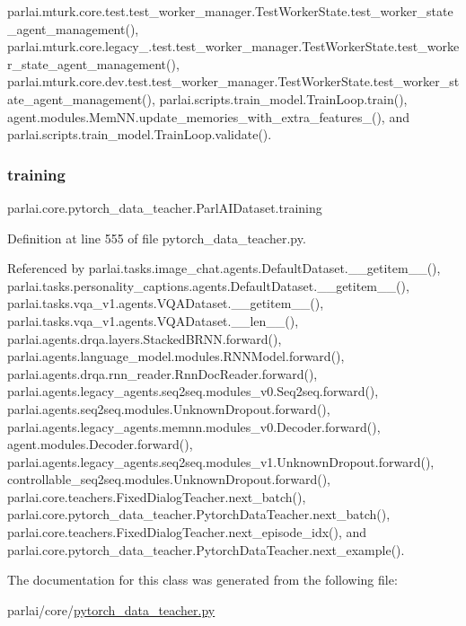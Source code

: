 parlai.\+mturk.\+core.\+test.\+test\+\_\+worker\+\_\+manager.\+Test\+Worker\+State.\+test\+\_\+worker\+\_\+state\+\_\+agent\+\_\+management(), parlai.\+mturk.\+core.\+legacy\+\_.\+test.\+test\+\_\+worker\+\_\+manager.\+Test\+Worker\+State.\+test\+\_\+worker\+\_\+state\+\_\+agent\+\_\+management(), parlai.\+mturk.\+core.\+dev.\+test.\+test\+\_\+worker\+\_\+manager.\+Test\+Worker\+State.\+test\+\_\+worker\+\_\+state\+\_\+agent\+\_\+management(), parlai.\+scripts.\+train\+\_\+model.\+Train\+Loop.\+train(), agent.\+modules.\+Mem\+N\+N.\+update\+\_\+memories\+\_\+with\+\_\+extra\+\_\+features\+\_\+(), and parlai.\+scripts.\+train\+\_\+model.\+Train\+Loop.\+validate().

\mbox{\label{classparlai_1_1core_1_1pytorch__data__teacher_1_1ParlAIDataset_a37ac7bc953e6c36a284c6031af796bfa}} 
\subsubsection{\texorpdfstring{training}{training}}
{\footnotesize\ttfamily parlai.\+core.\+pytorch\+\_\+data\+\_\+teacher.\+Parl\+A\+I\+Dataset.\+training}



Definition at line 555 of file pytorch\+\_\+data\+\_\+teacher.\+py.



Referenced by parlai.\+tasks.\+image\+\_\+chat.\+agents.\+Default\+Dataset.\+\_\+\+\_\+getitem\+\_\+\+\_\+(), parlai.\+tasks.\+personality\+\_\+captions.\+agents.\+Default\+Dataset.\+\_\+\+\_\+getitem\+\_\+\+\_\+(), parlai.\+tasks.\+vqa\+\_\+v1.\+agents.\+V\+Q\+A\+Dataset.\+\_\+\+\_\+getitem\+\_\+\+\_\+(), parlai.\+tasks.\+vqa\+\_\+v1.\+agents.\+V\+Q\+A\+Dataset.\+\_\+\+\_\+len\+\_\+\+\_\+(), parlai.\+agents.\+drqa.\+layers.\+Stacked\+B\+R\+N\+N.\+forward(), parlai.\+agents.\+language\+\_\+model.\+modules.\+R\+N\+N\+Model.\+forward(), parlai.\+agents.\+drqa.\+rnn\+\_\+reader.\+Rnn\+Doc\+Reader.\+forward(), parlai.\+agents.\+legacy\+\_\+agents.\+seq2seq.\+modules\+\_\+v0.\+Seq2seq.\+forward(), parlai.\+agents.\+seq2seq.\+modules.\+Unknown\+Dropout.\+forward(), parlai.\+agents.\+legacy\+\_\+agents.\+memnn.\+modules\+\_\+v0.\+Decoder.\+forward(), agent.\+modules.\+Decoder.\+forward(), parlai.\+agents.\+legacy\+\_\+agents.\+seq2seq.\+modules\+\_\+v1.\+Unknown\+Dropout.\+forward(), controllable\+\_\+seq2seq.\+modules.\+Unknown\+Dropout.\+forward(), parlai.\+core.\+teachers.\+Fixed\+Dialog\+Teacher.\+next\+\_\+batch(), parlai.\+core.\+pytorch\+\_\+data\+\_\+teacher.\+Pytorch\+Data\+Teacher.\+next\+\_\+batch(), parlai.\+core.\+teachers.\+Fixed\+Dialog\+Teacher.\+next\+\_\+episode\+\_\+idx(), and parlai.\+core.\+pytorch\+\_\+data\+\_\+teacher.\+Pytorch\+Data\+Teacher.\+next\+\_\+example().



The documentation for this class was generated from the following file\+:\begin{DoxyCompactItemize}
\item 
parlai/core/\hyperlink{pytorch__data__teacher_8py}{pytorch\+\_\+data\+\_\+teacher.\+py}\end{DoxyCompactItemize}
